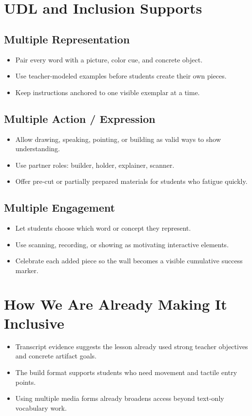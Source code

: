 \documentclass[11pt]{article}
\begin{document}
\section*{UDL and Inclusion Supports}
\subsection*{Multiple Representation}
\begin{itemize}[leftmargin=*]
\item Pair every word with a picture, color cue, and concrete object.
\item Use teacher-modeled examples before students create their own pieces.
\item Keep instructions anchored to one visible exemplar at a time.
\end{itemize}

\subsection*{Multiple Action / Expression}
\begin{itemize}[leftmargin=*]
\item Allow drawing, speaking, pointing, or building as valid ways to show understanding.
\item Use partner roles: builder, holder, explainer, scanner.
\item Offer pre-cut or partially prepared materials for students who fatigue quickly.
\end{itemize}

\subsection*{Multiple Engagement}
\begin{itemize}[leftmargin=*]
\item Let students choose which word or concept they represent.
\item Use scanning, recording, or showing as motivating interactive elements.
\item Celebrate each added piece so the wall becomes a visible cumulative success marker.
\end{itemize}

\section*{How We Are Already Making It Inclusive}
\begin{itemize}[leftmargin=*]
\item Transcript evidence suggests the lesson already used strong teacher objectives and concrete artifact goals.
\item The build format supports students who need movement and tactile entry points.
\item Using multiple media forms already broadens access beyond text-only vocabulary work.
\end{itemize}
\end{document}
